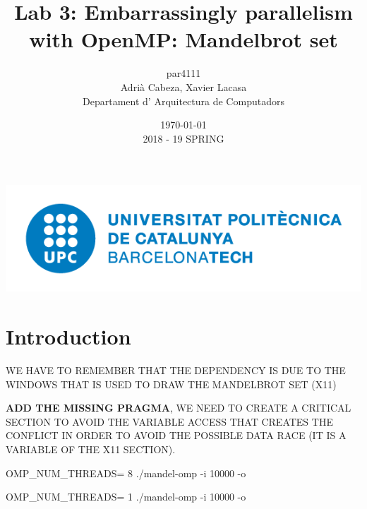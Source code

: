 \documentclass[12]{article}
\author{par4111 \\ Adrià Cabeza, Xavier Lacasa \\ Departament d' Arquitectura de Computadors}
\title{Lab 3: Embarrassingly parallelism with OpenMP: Mandelbrot set }
\date{\today \\ 2018 - 19 SPRING}
\begin{document}
\maketitle

\vspace*{\fill}
\begin{center}
\includegraphics[scale=0.5]{images/UPClogo.png}
\end{center}
\newpage
\tableofcontents
\newpage
\section{Introduction}

WE HAVE TO REMEMBER THAT THE DEPENDENCY IS DUE TO THE WINDOWS THAT IS USED TO DRAW THE MANDELBROT SET (X11)

\textbf{ADD THE MISSING PRAGMA}, WE NEED TO CREATE A CRITICAL SECTION TO AVOID THE VARIABLE ACCESS THAT CREATES THE CONFLICT IN ORDER TO AVOID THE POSSIBLE DATA RACE (IT IS A VARIABLE OF THE X11 SECTION). 

OMP_NUM_THREADS= 8 ./mandel-omp -i 10000 -o 

OMP_NUM_THREADS= 1 ./mandel-omp -i 10000 -o 
\end{document}
